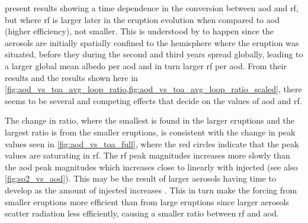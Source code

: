 \documentclass{ametsocV5}
\begin{document}
\citet[][their Fig.\ 1c,d]{marshall2020} present results showing a time dependence in
the conversion between \ac{aod} and \ac{rf}, but where \ac{rf} is larger later in the
eruption evolution when compared to \ac{aod} (higher efficiency), not smaller. This is
understood by \citet{marshall2020} to happen since the aerosols are initially spatially
confined to the hemisphere where the eruption was situated, before they during the
second and third years spread globally, leading to a larger global mean albedo per
\ac{aod} and in turn larger \ac{rf} per \ac{aod}. From their results and the results
shown here in \cref{fig:aod_vs_toa_avg_loop_ratio,fig:aod_vs_toa_avg_loop_ratio_scaled},
there seems to be several and competing effects that decide on the values of \ac{aod}
and \ac{rf}.

The change in ratio, where the smallest is found in the larger eruptions and the largest
ratio is from the smaller eruptions, is consistent with the change in peak values seen
in \cref{fig:aod_vs_toa_full}, where the red circles indicate that the peak values are
saturating in \ac{rf}. The \ac{rf} peak magnitudes increases more slowly than the
\ac{aod} peak magnitudes which increases close to linearly with injected  (see
also \cref{fig:so2_vs_aod}). This may be the result of larger aerosols having time to
develop as the amount of injected  increases \citep{niemeier2015,marshall2019}.
This in turn make the forcing from smaller eruptions more efficient than from large
eruptions since larger aerosols scatter radiation less efficiently, causing a smaller
ratio between \ac{rf} and \ac{aod}.


\end{document}
